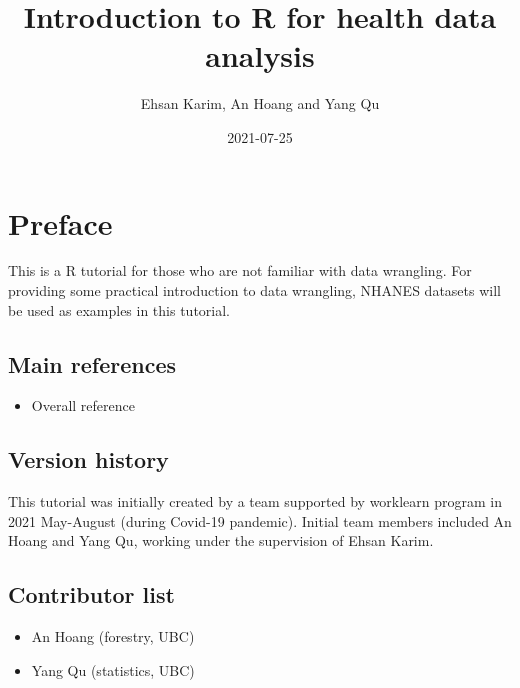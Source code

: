 \documentclass[
]{book}
\title{Introduction to R for health data analysis}
\author{Ehsan Karim, An Hoang and Yang Qu}
\date{2021-07-25}
\providecommand{\tightlist}{%
  \setlength{\itemsep}{0pt}\setlength{\parskip}{0pt}}
\begin{document}
\maketitle

{
\setcounter{tocdepth}{1}
\tableofcontents
}
\hypertarget{preface}{%
\chapter*{Preface}\label{preface}}

This is a R tutorial for those who are not familiar with data wrangling. For providing some practical introduction to data wrangling, NHANES datasets will be used as examples in this tutorial.

\hypertarget{main-references}{%
\section*{Main references}\label{main-references}}

\begin{itemize}
\tightlist
\item
  Overall reference \citet{wickham2016r}
\end{itemize}

\hypertarget{version-history}{%
\section*{Version history}\label{version-history}}

This tutorial was initially created by a team supported by worklearn program in 2021 May-August (during Covid-19 pandemic). Initial team members included An Hoang and Yang Qu, working under the supervision of Ehsan Karim.

\hypertarget{contributor-list}{%
\section*{Contributor list}\label{contributor-list}}

\begin{itemize}
\tightlist
\item
  An Hoang (forestry, UBC)
\item
  Yang Qu (statistics, UBC)
\end{itemize}
\end{document}
